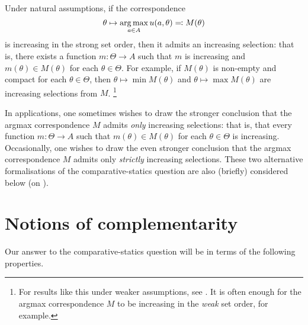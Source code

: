 \begin{remark}
	\label{remark:mcs_selection}
	Under natural assumptions, if the correspondence
	\begin{equation*}
		\theta \mapsto \operatorname*{arg\,max}_{a \in A} u(a,\theta) \eqqcolon M(\theta)
	\end{equation*}
	is increasing in the strong set order, then it admits an increasing selection: that is, there exists a function $m : \Theta \to A$ such that $m$ is increasing and $m(\theta) \in M(\theta)$ for each $\theta \in \Theta$. For example, if $M(\theta)$ is non-empty and compact for each $\theta \in \Theta$, then $\theta \mapsto \min M(\theta)$ and $\theta \mapsto \max M(\theta)$ are increasing selections from $M$.%
		\footnote{For results like this under weaker assumptions, see \textcite{Kukushkin2013}. It is often enough for the argmax correspondence $M$ to be increasing in the \emph{weak} set order, for example.}

	In applications, one sometimes wishes to draw the stronger conclusion that the argmax correspondence $M$ admits \emph{only} increasing selections: that is, that every function $m : \Theta \to A$ such that $m(\theta) \in M(\theta)$ for each $\theta \in \Theta$ is increasing. Occasionally, one wishes to draw the even stronger conclusion that the argmax correspondence $M$ admits only \emph{strictly} increasing selections. These two alternative formalisations of the comparative-statics question are also (briefly) considered below (on ).
\end{remark}



\section{Notions of complementarity}
\label{mcs:compl}

Our answer to the comparative-statics question will be in terms of the following properties.

